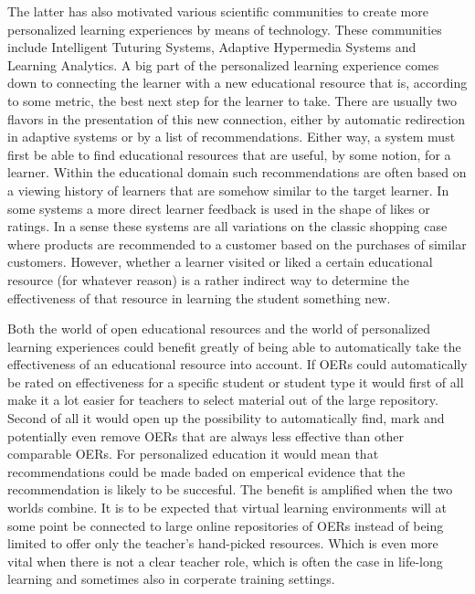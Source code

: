 The latter has also motivated various scientific communities to create more
personalized learning experiences by means of technology. These communities
include Intelligent Tuturing Systems, Adaptive Hypermedia Systems and Learning
Analytics. A big part of the personalized learning experience comes down to
connecting the learner with a new educational resource that is, according to
some metric, the best next step for the learner to take. There are usually two
flavors in the presentation of this new connection, either by automatic
redirection in adaptive systems or by a list of recommendations. Either way, a
system must first be able to find educational resources that are useful, by
some notion, for a learner. Within the educational domain such recommendations
are often based on a viewing history of learners that are somehow similar to
the target learner. In some systems a more direct learner feedback is used in
the shape of likes or ratings. In a sense these systems are all variations on
the classic shopping case where products are recommended to a customer based on
the purchases of similar customers. However, whether a learner visited or liked
a certain educational resource (for whatever reason) is a rather indirect way
to determine the effectiveness of that resource in learning the student
something new.

Both the world of open educational resources and the world of personalized
learning experiences could benefit greatly of being able to automatically take
the effectiveness of an educational resource into account. If OERs could
automatically be rated on effectiveness for a specific student or student type
it would first of all make it a lot easier for teachers to select material out
of the large repository. Second of all it would open up the possibility to
automatically find, mark and potentially even remove OERs that are always less
effective than other comparable OERs. For personalized education it would mean
that recommendations could be made baded on emperical evidence that the
recommendation is likely to be succesful. The benefit is amplified when the two
worlds combine. It is to be expected that virtual learning environments will at
some point be connected to large online repositories of OERs instead of being
limited to offer only the teacher’s hand-picked resources. Which is even more
vital when there is not a clear teacher role, which is often the case in
life-long learning and sometimes also in corperate training settings.

